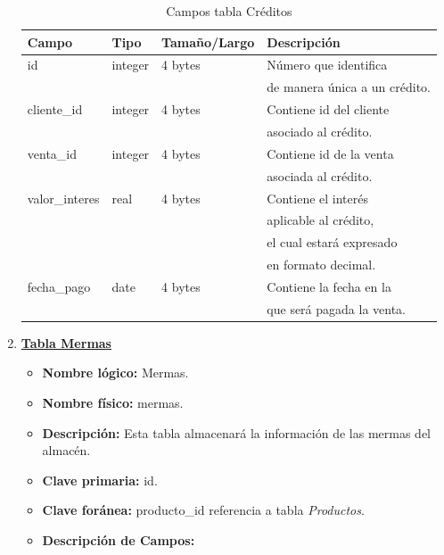 \documentclass[letterpaper,12pt]{article}
\begin{document}
\begin{enumerate}
\begin{table}[!ht]
\caption{Campos tabla Créditos}
\begin{center}
\begin{tabular}{|l|l|l|l|}
\hline
\textbf{Campo} \hspace*{2cm} & \textbf{Tipo} & \textbf{Tamaño/Largo} & \textbf{Descripción} \hspace*{3,5cm} \\
\hline
id & integer & 4 bytes&Número que identifica \\ 
\mbox{} & \mbox{} & &de manera única a un crédito.\\
\hline

cliente\_id & integer & 4 bytes&Contiene id del cliente\\
\mbox{} & \mbox{} & &asociado al crédito.\\
\hline

venta\_id & integer & 4 bytes&Contiene id de la venta\\
\mbox{} & \mbox{} & &asociada al crédito.\\
\hline

valor\_interes & real & 4 bytes &Contiene el interés\\
\mbox{} &  & &aplicable al crédito,\\
\mbox{} & \mbox{} & &el cual estará expresado\\
\mbox{} & \mbox{} & &en formato decimal.\\
\hline

fecha\_pago & date & 4 bytes &Contiene la fecha en la\\
\mbox{} & \mbox{} & &que será pagada la venta.\\
\hline

\end{tabular}
\end{center}
\end{table}

\newpage

\item \textbf{\underline{Tabla Mermas}}
\begin{itemize}
\item \textbf{Nombre lógico:} Mermas.
\item \textbf{Nombre físico:} mermas.
\item \textbf{Descripción:} Esta tabla almacenará la información de las mermas del almacén.
\item \textbf{Clave primaria:} id.
\item \textbf{Clave foránea:} producto\_id referencia a tabla \emph{Productos}.
\item\textbf{Descripción de Campos:}
\end{itemize}


\end{enumerate}
\end{document}
